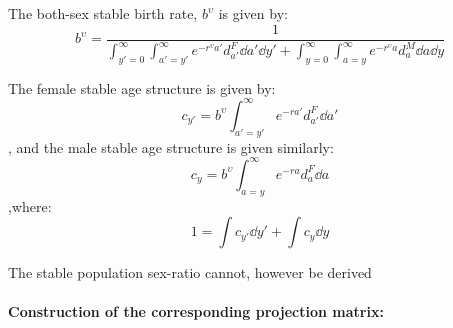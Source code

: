 The both-sex stable birth rate, $b^\upsilon$ is given by:
\begin{equation}
b^\upsilon = \frac{1}{
            \int _{y'=0}^\infty \int _{a'=y'}^\infty e^{-r^\upsilon a'}
                      d_{a'}^F \dd a' \dd y' + 
            \int _{y=0}^\infty \int _{a=y}^\infty e^{-r^\upsilon a}
                      d_{a}^M \dd a \dd y}                     
\end{equation}

The female stable age structure is given by:
\begin{equation}
c_{y'} = b^\upsilon \int _{a'=y'}^\infty e^{-ra'} d_{a'}^F \dd a'
\end{equation}
, and the male stable age structure is given similarly:
\begin{equation}
c_{y} = b^\upsilon \int _{a=y}^\infty e^{-ra} d_{a}^F \dd a
\end{equation}
,where:
\begin{equation}
1 = \int c_{y'} \dd y' + \int c_{y} \dd y
\end{equation}

The stable population sex-ratio cannot, however be derived

\paragraph{Construction of the corresponding projection matrix:}

